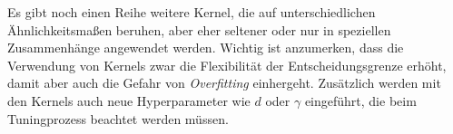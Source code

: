 \documentclass[
]{article}
\begin{document}
Es gibt noch einen Reihe weitere Kernel, die auf unterschiedlichen
Ähnlichkeitsmaßen beruhen, aber eher seltener oder nur in speziellen
Zusammenhänge angewendet werden. Wichtig ist anzumerken, dass die
Verwendung von Kernels zwar die Flexibilität der Entscheidungsgrenze
erhöht, damit aber auch die Gefahr von \textit{Overfitting} einhergeht.
Zusätzlich werden mit den Kernels auch neue Hyperparameter wie \(d\)
oder \(\gamma\) eingeführt, die beim Tuningprozess beachtet werden
müssen.

\printbibliography
\end{document}
